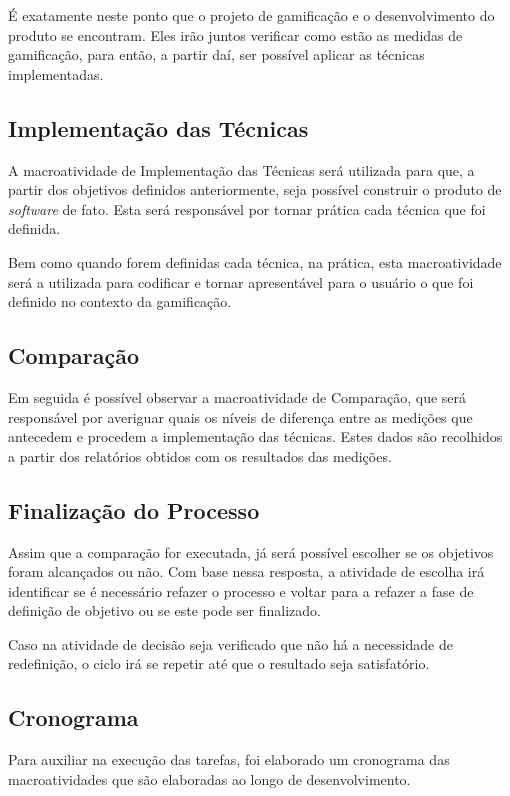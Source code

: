 É exatamente neste ponto que o projeto de gamificação e o desenvolvimento do produto
se encontram. Eles irão juntos verificar como estão as medidas de gamificação, para
então, a partir daí, ser possível aplicar as técnicas implementadas.

\subsection{Implementação das Técnicas}
\label{sub:implematationtechnics}
A macroatividade de Implementação das Técnicas será utilizada para que, a partir
dos objetivos definidos anteriormente, seja possível construir o produto de \textit{software}
de fato. Esta será responsável por tornar prática
cada técnica que foi definida.

Bem como quando forem definidas cada técnica, na prática, esta macroatividade
será a utilizada para codificar e tornar apresentável para o usuário o que
foi definido no contexto da gamificação.

\subsection{Comparação}
\label{sub:Comparacao}
Em seguida é possível observar a macroatividade de Comparação, que será
responsável por averiguar quais os níveis de diferença entre as medições que
antecedem e procedem a implementação das técnicas. Estes dados são recolhidos a
partir dos relatórios obtidos com os resultados das medições.

\subsection{Finalização do Processo}
\label{sub:finalprocess}
Assim que a comparação for executada, já será possível escolher se os objetivos
foram alcançados ou não. Com base nessa resposta, a atividade de escolha irá
identificar se é necessário refazer o processo e voltar para a refazer a fase
de definição de objetivo ou se este pode ser finalizado.

Caso na atividade de decisão seja verificado que não há a necessidade de
redefinição, o ciclo irá se repetir até que o resultado seja satisfatório.

\subsection{Cronograma}
\label{sub:cronograma}
Para auxiliar na execução das tarefas, foi elaborado um cronograma
das macroatividades que são elaboradas ao longo de desenvolvimento.

